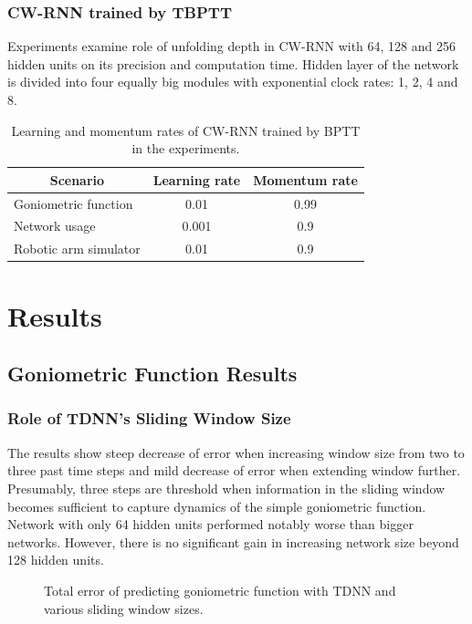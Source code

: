 \documentclass[12pt,oneside]{fithesis2}
\begin{document}
\subsection{CW-RNN trained by TBPTT}
Experiments examine role of unfolding depth in CW-RNN with 64, 128 and 256 hidden units on its precision and computation time. Hidden layer of the network is divided into four equally big modules with exponential clock rates: 1, 2, 4 and 8.

\begin{table}[h]
\centering
\begin{tabular}{|l|c|c|}
\hline
\multicolumn{1}{|c|}{\textbf{Scenario}} & \textbf{Learning rate} & \textbf{Momentum rate} \\ \hline
Goniometric function                    & 0.01                   & 0.99                    \\ \hline
Network usage                           & 0.001                  & 0.9                    \\ \hline
Robotic arm simulator                   & 0.01                   & 0.9                    \\ \hline
\end{tabular}
\caption{Learning and momentum rates of CW-RNN trained by BPTT in the experiments.}
\end{table}

\chapter{Results}
\section{Goniometric Function Results}
\subsection{Role of TDNN's Sliding Window Size}
The results show steep decrease of error when increasing window size from two to three past time steps and mild decrease of error when extending window further. Presumably, three steps are threshold when information in the sliding window becomes sufficient to capture dynamics of the simple goniometric function. Network with only 64 hidden units performed notably worse than bigger networks. However, there is no significant gain in increasing network size beyond 128 hidden units.

	\begin{figure}[H]
		\caption{Total error of predicting goniometric function with TDNN and various sliding window sizes.}
		
	\end{figure}
\end{document}
